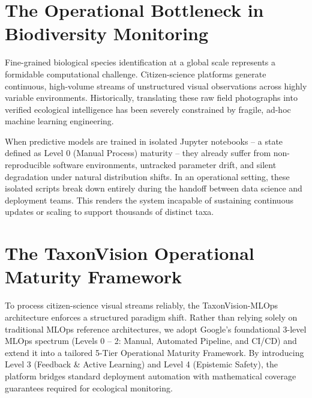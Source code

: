 \section{The Operational Bottleneck in Biodiversity Monitoring}
Fine-grained biological species identification at a global scale represents a formidable computational challenge. Citizen-science platforms generate continuous, high-volume streams of unstructured visual observations across highly variable environments. Historically, translating these raw field photographs into verified ecological intelligence has been severely constrained by fragile, ad-hoc machine learning engineering.

When predictive models are trained in isolated Jupyter notebooks -- a state defined as Level 0 (Manual Process) maturity -- they already suffer from non-reproducible software environments, untracked parameter drift, and silent degradation under natural distribution shifts. In an operational setting, these isolated scripts break down entirely during the handoff between data science and deployment teams. This renders the system incapable of sustaining continuous updates or scaling to support thousands of distinct taxa.

\section{The TaxonVision Operational Maturity Framework}
To process citizen-science visual streams reliably, the TaxonVision-MLOps architecture enforces a structured paradigm shift. Rather than relying solely on traditional MLOps reference architectures, we adopt Google's foundational 3-level MLOps spectrum (Levels 0 -- 2: Manual, Automated Pipeline, and CI/CD) and extend it into a tailored 5-Tier Operational Maturity Framework. By introducing Level 3 (Feedback \& Active Learning) and Level 4 (Epistemic Safety), the platform bridges standard deployment automation with mathematical coverage guarantees required for ecological monitoring.

